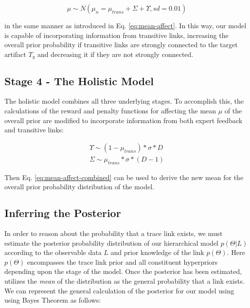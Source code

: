 \begin{equation}\label{eq:mean-affect-combined}
	\mu \sim N(\mu_n= \mu_{trans} + \Sigma + \Upsilon, sd=0.01)
\end{equation}

\noindent in the same manner as introduced in Eq. \ref{eq:mean-affect}. In this way, our model is capable of incorporating information from transitive links, increasing the overall prior probability if transitive links are strongly connected to the target artifact $T_y$ and decreasing it if they are not strongly connected.

\subsection{Stage 4 - The Holistic Model}
\label{sub:model-comp4}

The holistic model combines all three underlying stages. To accomplish this, the calculations of the reward and penalty functions for affecting the mean $\mu$ of the overall prior are modified to incorporate information from both expert feedback and transitive links:

\begin{equation}
\begin{split}
	\Upsilon \sim (1-\mu_{trans})*\sigma*D \\
	\Sigma \sim \mu_{trans}*\sigma*(D-1)
\end{split}
\end{equation}

\noindent Then Eq. \ref{eq:mean-affect-combined} can be used to derive the new mean for the overall prior probability distribution of the model.

\subsection{Inferring the Posterior}
\label{sub:model-posterior}

In order to reason about the probability that a trace link exists, we must estimate the posterior probability distribution of our hierarchical model $p(\Theta|L)$ according to the observable data $L$ and prior knowledge of the link $p(\Theta)$. Here $p(\Theta)$ encompasses the trace link prior and all constituent hyperpriors depending upon the stage of the model.  Once the posterior has been estimated, \Comet utilizes the \textit{mean} of the distribution as the general probability that a link exists. We can represent the general calculation of the posterior for our model using using Bayes Theorem as follows:  

